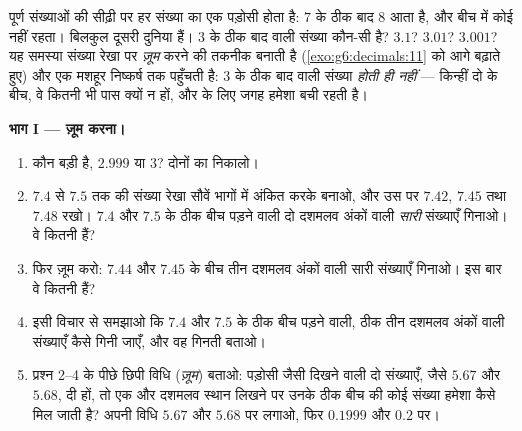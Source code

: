 \begin{problem}
\label{pb:g6:decimals:1}
पूर्ण संख्याओं की सीढ़ी पर हर संख्या का एक पड़ोसी होता है: $7$ के
ठीक बाद $8$ आता है, और बीच में कोई नहीं रहता। 
बिलकुल दूसरी दुनिया हैं। $3$ के ठीक बाद वाली संख्या कौन-सी है?
$3.1$? $3.01$? $3.001$? यह समस्या संख्या रेखा पर \emph{ज़ूम}
करने की तकनीक बनाती है (\cref{exo:g6:decimals:11} को आगे
बढ़ाते हुए) और एक मशहूर निष्कर्ष तक पहुँचती है: $3$ के ठीक बाद
वाली संख्या \emph{होती ही नहीं} --- किन्हीं दो  के
बीच, वे कितनी भी पास क्यों न हों, और के लिए जगह हमेशा बची रहती है।

\medskip
\noindent\textbf{भाग I --- ज़ूम करना।}
\begin{enumerate}
  \item कौन बड़ी है, $2.999$ या $3$? दोनों का  निकालो।
  \item $7.4$ से $7.5$ तक की संख्या रेखा सौवें भागों में अंकित
        करके बनाओ, और उस पर $7.42$, $7.45$ तथा $7.48$ रखो।
        $7.4$ और $7.5$ के ठीक बीच पड़ने वाली दो दशमलव अंकों
        वाली \emph{सारी} संख्याएँ गिनाओ। वे कितनी हैं?
  \item फिर ज़ूम करो: $7.44$ और $7.45$ के बीच तीन दशमलव अंकों
        वाली सारी संख्याएँ गिनाओ। इस बार वे कितनी
        हैं?
  \item इसी विचार से समझाओ कि $7.4$ और $7.5$ के ठीक बीच पड़ने
        वाली, ठीक तीन दशमलव अंकों वाली संख्याएँ कैसे गिनी जाएँ,
        और वह गिनती बताओ।
  \item प्रश्न 2--4 के पीछे छिपी विधि (\emph{ज़ूम}) बताओ: पड़ोसी
        जैसी दिखने वाली दो संख्याएँ, जैसे $5.67$ और $5.68$, दी
        हों, तो एक और दशमलव स्थान लिखने पर उनके ठीक बीच की कोई
        संख्या हमेशा कैसे मिल जाती है? अपनी विधि $5.67$ और $5.68$
        पर लगाओ, फिर $0.1999$ और $0.2$ पर।
\end{enumerate}


\end{problem}
